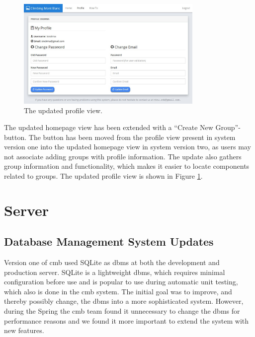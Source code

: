\begin{figure}[h!]
    \centering
    \includegraphics[width=0.8\textwidth]{figs/new_profile.jpg}
    \caption[The updated profile view]{The updated profile view.}
    \label{fig:new-profile}
\end{figure}

The updated homepage view has been extended with a ``Create New Group''-button. The button has been moved from the profile view present in system version one into the updated homepage view in system version two, as users may not associate adding groups with profile information. The update also gathers group information and functionality, which makes it easier to locate components related to groups. The updated profile view is shown in Figure \ref{fig:new-profile}.

\section{Server}
\label{sec:impr-server}
\subsection{Database Management System Updates}
\label{sub-sec:impr-dbms}
Version one of \gls{cmb} used SQLite \cite{SQLITE} as \gls{dbms} at both the development and production server. SQLite is a lightweight \gls{dbms}, which requires minimal configuration before use and is popular to use during automatic unit testing, which also is done in the \gls{cmb} system. The initial goal was to improve, and thereby possibly change, the \gls{dbms} into a more sophisticated system. However, during the Spring the \gls{cmb} team found it unnecessary to change the \gls{dbms} for performance reasons and we found it more important to extend the system with new features. \\

